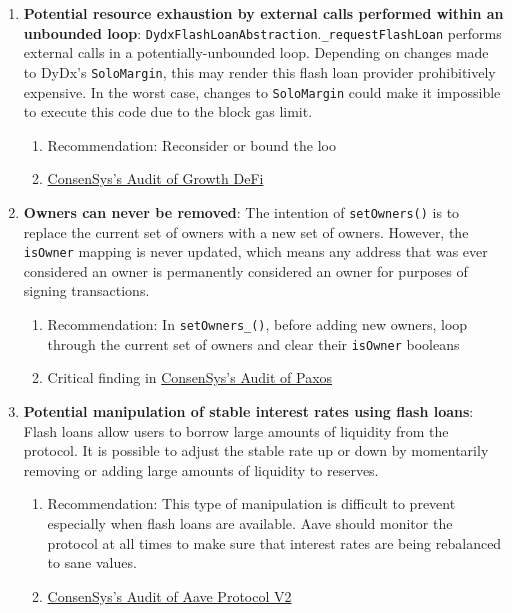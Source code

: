 \begin{enumerate}
\item\textbf{Potential resource exhaustion by external calls performed within an unbounded loop}: \verb|DydxFlashLoanAbstraction|.\verb|_requestFlashLoan| performs external calls in a potentially-unbounded loop. Depending on changes made to DyDx’s \verb|SoloMargin|, this may render this flash loan provider prohibitively expensive. In the worst case, changes to \verb|SoloMargin| could make it impossible to execute this code due to the block gas limit.
	\begin{enumerate}
	\item Recommendation: Reconsider or bound the loo
	\item\href{https://consensys.net/diligence/audits/2020/12/growth-defi-v1/\#potential-resource-exhaustion-by-external-calls-performed-within-an-unbounded-loop}{ConsenSys's Audit of Growth DeFi}
	\end{enumerate}

\item\textbf{Owners can never be removed}: The intention of \verb|setOwners()| is to replace the current set of owners with a new set of owners. However, the \verb|isOwner| mapping is never updated, which means any address that was ever considered an owner is permanently considered an owner for purposes of signing transactions.
	\begin{enumerate}
	\item Recommendation: In \verb|setOwners_()|, before adding new owners, loop through the current set of owners and clear their \verb|isOwner| booleans
	\item Critical finding in \href{https://consensys.net/diligence/audits/2020/11/paxos/\#owners-can-never-be-removed}{ConsenSys's Audit of Paxos}
	\end{enumerate}

\item\textbf{Potential manipulation of stable interest rates using flash loans}: Flash loans allow users to borrow large amounts of liquidity from the protocol. It is possible to adjust the stable rate up or down by momentarily removing or adding large amounts of liquidity to reserves.
	\begin{enumerate}
	\item Recommendation: This type of manipulation is difficult to prevent especially when flash loans are available. Aave should monitor the protocol at all times to make sure that interest rates are being rebalanced to sane values.
	\item\href{https://consensys.net/diligence/audits/2020/09/aave-protocol-v2/\#potential-manipulation-of-stable-interest-rates-using-flash-loans}{ConsenSys's Audit of Aave Protocol V2}
	\end{enumerate}


\end{enumerate}
